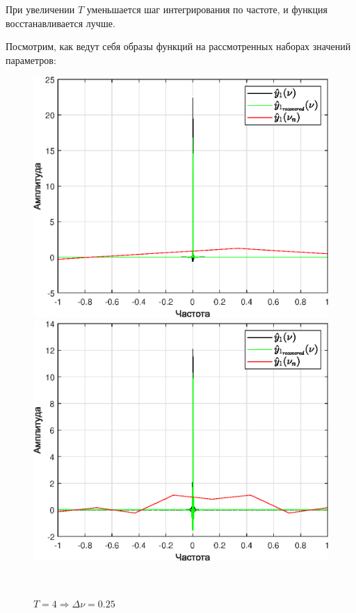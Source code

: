\documentclass[a4paper]{article}
\begin{document}
При увеличении $T$ уменьшается шаг интегрирования по частоте, и функция восстанавливается лучше.

Посмотрим, как ведут себя образы функций на рассмотренных наборах значений параметров:

\begin{figure}[H]
    \begin{minipage}{0.5\textwidth}
        \centering \includegraphics[width=\textwidth]{graphs2/T_2_dt_0.5_B_1_dv_0.5/func1_image.eps}
        \caption{$T = 2 \Rightarrow \Delta \nu = 0.5$}
    \end{minipage}\hfill
    \begin{minipage}{0.5\textwidth}
        \centering \includegraphics[width=\textwidth]{graphs2/T_4_dt_0.5_B_1_dv_0.25/func1_image.eps}
        \caption{$T = 4 \Rightarrow \Delta \nu = 0.25$}
    \end{minipage}\\[1em]
\end{figure}\noindent\
\end{document}
